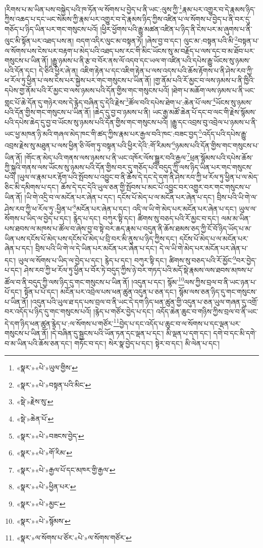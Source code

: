།རིགས་པ་མ་ཡིན་པས་བསྐྱེད་པའི་ཁ་ཏོན་ལ་སོགས་པ་བྱེད་པ་ནི་ཡང་:ལུས་ཀྱི་\footnote{«སྣར་»«པེ་»ཡུལ་གྱིས་}རྣམ་པར་འགྱུར་བ་དེ་རྣམས་ཉིད་ཀྱིས་འཆད་པ་དང་ཡང་སེམས་ཀྱི་རྣམ་པར་འགྱུར་བ་དེ་རྣམས་ཉིད་ཀྱིས་འཛིན་པ་ལ་སོགས་པ་བྱེད་པ་ནི་བར་དུ་གཅོད་པ་ཉིད་ཡིན་པར་གང་གསུངས་པའོ། །ཕྱིར་ཕྱོགས་པའི་རྒྱུ་མཚན་འཛིན་པ་ཉིད་ནི་ངེས་པར་མ་ཞུགས་པ་ནི་ལུང་མི་སྟོན་པར་འཐད་པས་ན། བདག་འདིར་ལུང་མ་བསྟན་ཏོ། །ཞེས་བྱ་བ་དང་། ལུང་མ་:བསྟན་པའི་མི་\footnote{«སྣར་»«པེ་»བསྟན་པའི་མིང་}བསྟན་པ་ལ་སོགས་པས་ངེས་པར་བརྟག་པ་མེད་པའི་འཐད་པས་རང་གི་མིང་ཡོངས་སུ་མ་བརྗོད་པ་ལས་དང་བ་མ་ཐོབ་པར་གསུངས་པ་ཡིན་ནོ། །རྒྱུ་ཉམས་པ་ནི་རྩ་བ་བོར་ནས་ལོ་འདབ་དང་ཡལ་ག་འཛིན་པའི་དཔེས་རྒྱུ་ཡོངས་སུ་ཉམས་པའི་དོན་དང་། དེ་ཅིའི་ཕྱིར་ཞེ་ན། འཇིག་རྟེན་པ་དང་འཇིག་རྟེན་པ་ལས་འདས་པའི་ཆོས་རྟོགས་པ་ནི་ཤེས་རབ་ཀྱི་ཕ་རོལ་ཏུ་ཕྱིན་པ་ལས་ངེས་པར་སྐྱེས་པར་གང་གསུངས་པ་ཡིན་ནོ། །གྱ་ནོམ་པའི་རོ་མྱང་བ་ལས་ཉམས་པ་ནི་ཁྱིའི་དཔེས་གྱ་ནོམ་པའི་རོ་མྱང་བ་ལས་ཉམས་པའི་དོན་གྱིས་གང་གསུངས་པའོ། །ཐེག་པ་མཆོག་ལས་ཉམས་པ་ནི་ཡང་གླང་པོ་ཆེ་དོན་དུ་གཉེར་བས་དེ་རྙེད་བཞིན་དུ་དེའི་རྗེས་\footnote{«སྡེ་»རྗེས་སུ་}ཚོལ་བའི་དཔེས་ཐེག་པ་:ཆེན་པོ་ལས་\footnote{«སྡེ་»ཆེན་པོ་}ཡོངས་སུ་ཉམས་པའི་དོན་གྱིས་གང་གསུངས་པ་ཡིན་ནོ། །ཆེད་དུ་བྱ་བ་ཉམས་པ་ནི། ཡང་རྒྱ་མཚོ་ཆེན་པོ་དང་བ་ལང་གི་རྗེས་སྙོམས་པའི་དཔེས་ཆེད་དུ་བྱ་བ་ཡོངས་སུ་ཉམས་པའི་དོན་གྱིས་གང་གསུངས་པའོ། །རྒྱུ་དང་འབྲས་བུ་འབྲེལ་པ་ཉམས་པ་ནི་ཡང་ཕྱ་མཁན་ཉི་མའི་གཞལ་མེད་ཁང་གི་ཚད་ཀྱིས་རྣམ་པར་རྒྱལ་བའི་ཁང་:བཟང་བྱད་\footnote{«སྣར་»«པེ་»བཟངས་བྱེད་}འདོད་པའི་དཔེས་རྒྱུ་འབྲས་རྗེས་སུ་མཐུན་པ་ལས་ཕྱིན་ཅི་ལོག་ཏུ་བསྟན་པའི་ཕྱིར་དེའི་:གོ་རིམས་\footnote{«སྣར་»«པེ་»གོ་རིམ་}ཉམས་པའི་དོན་གྱིས་གང་གསུངས་པ་ཡིན་ནོ། །གོང་ན་མེད་པའི་གནས་ལས་ཉམས་པ་ནི་ཡང་འཁོར་ལོས་སྒྱུར་བའི་རྒྱལ་\footnote{«སྣར་»«པེ་»རྒྱལ་པོ་དང་མཁར་གྱི་རྒྱལ་}ཕྲན་སྙོམས་པའི་དཔེས་ཆོས་ཀྱི་སྐུའི་གནས་ལས་ཡོངས་སུ་ཉམས་པའི་དོན་གྱིས་བར་དུ་གཅོད་པའི་བདུད་ཀྱི་ལས་ཉིད་ཡིན་པར་གང་གསུངས་པའོ། །ཡུལ་ལ་རྣམ་པར་རྟོག་པའི་སྤོབས་པ་འབྱུང་བ་ནི་ཆོས་དེ་དང་དེ་དག་ནི་ཤེས་རབ་ཀྱི་ཕ་རོལ་ཏུ་ཕྱིན་པ་ལ་མེད་ཅིང་མི་དམིགས་པ་དང་། ཆོས་དེ་དང་དེའི་ཡུལ་ཅན་གྱི་སྤོབས་པ་མང་པོ་འབྱུང་བར་འགྱུར་བར་གང་གསུངས་པ་ཡིན་ནོ། །ཡི་གེ་འདྲི་བ་ལ་མངོན་པར་ཞེན་པ་དང་། དངོས་པོ་མེད་པ་ལ་མངོན་པར་ཞེན་པ་དང་། བྲིས་པའི་ཡི་གེ་ལ་ཤེས་རབ་ཀྱི་ཕ་རོལ་ཏུ་:ཕྱིན་པ་\footnote{«སྣར་»«པེ་»ཕྱིན་པར་}མངོན་པར་ཞེན་པ་དང་། འདི་ལ་ཡི་གེ་མེད་པར་མངོན་པར་ཞེན་པ་དང་། ཡུལ་ལ་སོགས་པ་ཡིད་ལ་བྱེད་པ་དང་། རྙེད་པ་དང་། བཀུར་སྟི་དང་། ཚིགས་སུ་བཅད་པའི་རོ་མྱང་བ་དང་། ལམ་མ་ཡིན་པས་ཐབས་ལ་མཁས་པ་ཚོལ་བ་ཞེས་བྱ་བ་སྟེ་བར་ཆད་རྣམ་པ་བདུན་ནི་ཆོས་ཐམས་ཅད་ཀྱི་ངོ་བོ་ཉིད་ཡོད་པ་མ་ཡིན་པས་དངོས་པོ་མེད་པས་དངོས་པོ་མེད་པ་བྲི་བར་མི་ནུས་པ་ཉིད་ཀྱིས་དང་། དངོས་པོ་མེད་པ་ལ་མངོན་པར་ཞེན་པ་དང་། བྲིས་པའི་ཡི་གེ་ལ་དེ་ཡིན་པར་མངོན་པར་ཞེན་པ་དང་། དེ་ལ་ཡི་གེ་མེད་པར་མངོན་པར་ཞེན་པ་དང་། ཡུལ་ལ་སོགས་པ་ཡིད་ལ་བྱེད་པ་དང་། རྙེད་པ་དང་། བཀུར་སྟི་དང་། ཚིགས་སུ་བཅད་པའི་རོ་མྱོང་\footnote{«སྣར་»«པེ་»མྱང་}བར་བྱེད་པ་དང་། ཤེས་རབ་ཀྱི་ཕ་རོལ་ཏུ་ཕྱིན་པ་བོར་ཏེ་བདུད་ཀྱིས་ཉེ་བར་གཏད་པའི་མདོ་སྡེ་རྣམས་ལས་ཐབས་མཁས་པ་ཚོལ་བ་ནི་བདུད་ཀྱི་ལས་ཉིད་དུ་གང་གསུངས་པ་ཡིན་ནོ། །འདུན་པ་དང་། སྙོམ་\footnote{«སྣར་»«པེ་»སྙོམས་}ལས་ཀྱིས་བྲལ་བ་ནི་ཡང་ཉན་པ་པོ་དང་། སྟོན་པ་པོ་དང་། མངོན་པར་འབྲེལ་པས་ཕན་ཚུན་འདུན་པ་ཅན་དང་། སྙོམ་ལས་ཅན་ཉིད་དུ་གང་གསུངས་པ་ཡིན་ནོ། །འདུན་པའི་ཡུལ་ཐ་དད་པས་བྲལ་བ་ནི་ཡང་དེ་དག་ཉིད་ཕན་ཚུན་གྱི་འདུན་པ་ཅན་ཡུལ་གཞན་དུ་འགྲོ་བར་འདོད་པ་ཉིད་དུ་གང་གསུངས་པའོ། །རྙེད་པ་གཙོར་བྱེད་པ་དང་། འདོད་ཆེན་ཆུང་བ་གཉིས་ཀྱིས་བྲལ་བ་ནི་ཡང་དེ་དག་ཉིད་ཕན་ཚུན་རྙེད་པ་:ལ་སོགས་པ་གཙོར་\footnote{«སྣར་»ལ་སོགས་པ་ཙོར་«པེ་»ལ་སོགས་གཙོར་}བྱེད་པ་དང་འདོད་པ་ཆུང་བ་ལ་སོགས་པ་དང་ལྡན་པར་གསུངས་པ་ཡིན་ནོ། །དེ་བཞིན་དུ་སྦྱངས་པའི་ཡོན་ཏན་དང་ལྡན་པ་དང་། མི་ལྡན་པ་དག་དང་། དགེ་བ་དང་མི་དགེ་བ་མ་ཡིན་པའི་ཆོས་ཅན་དང་། གཏོང་བ་དང་། སེར་སྣ་བྱེད་པ་དང་། སྟེར་བ་དང་། མི་ལེན་པ་དང་། 